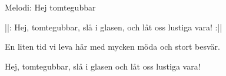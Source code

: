 \begin{song}

\begin{songmeta}
Melodi: Hej tomtegubbar
\end{songmeta}

\begin{songtext}
||: Hej, tomtegubbar, slå i glasen,
och låt oss lustiga vara! :||

En liten tid vi leva här
med mycken möda och stort besvär.

Hej, tomtegubbar, slå i glasen
och låt oss lustiga vara!
\end{songtext}
\end{song}
